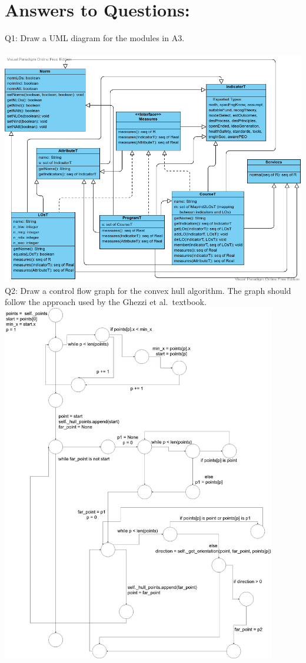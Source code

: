 \documentclass[12pt]{article}
\begin{document}
\section*{Answers to Questions:}
Q1: Draw a UML diagram for the modules in A3.\\\\
\includegraphics[width=\textwidth]{A3-UML.png}
\newpage
Q2: Draw a control flow graph for the convex hull algorithm.  The graph should follow the approach used by the Ghezzi et al.\ textbook.\\
\includegraphics[width=0.9\textwidth]{control_flow_graph.png}
\end{document}
